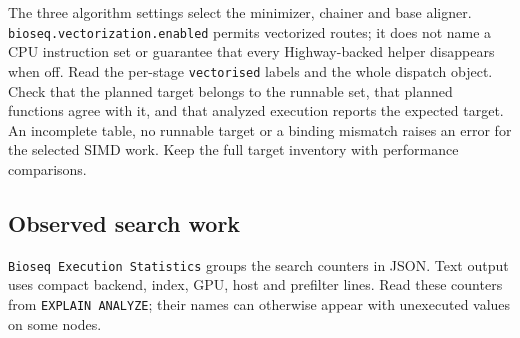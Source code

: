 The three algorithm settings select the minimizer, chainer and base aligner.
\nolinkurl{bioseq.vectorization.enabled} permits vectorized routes; it does not
name a CPU instruction set or guarantee that every Highway-backed helper disappears when
off. Read the per-stage \texttt{vectorised} labels and the whole dispatch
object. Check that the planned target belongs to the runnable set, that
planned functions agree with it, and that analyzed execution reports the
expected target. An incomplete table, no runnable target or a binding mismatch
raises an error for the selected SIMD work. Keep the full target inventory
with performance comparisons.

\subsection{Observed search work}

\texttt{Bioseq Execution Statistics} groups the search counters in JSON.
Text output uses compact backend, index, GPU, host and prefilter lines.
Read these counters from \texttt{EXPLAIN ANALYZE}; their names can otherwise
appear with unexecuted values on some nodes.

